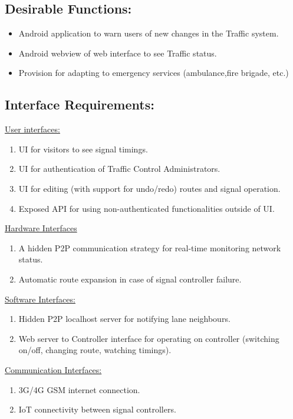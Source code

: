 \documentclass[12pt,a4paper,final]{report}
\begin{document}
\subsection{Desirable Functions:}
\begin{itemize}
	\item Android application to warn users of new changes in the Traffic system.
	\item Android webview of web interface to see Traffic status.
	\item Provision for adapting to emergency services (ambulance,fire brigade, etc.)
\end{itemize}

\subsection{Interface Requirements:}
\underline{User interfaces:}
\begin{enumerate}
	\item UI for visitors to see signal timings.
	\item UI for authentication of Traffic Control Administrators.
	\item UI for editing (with support for undo/redo) routes and signal operation.
	\item Exposed API for using non-authenticated functionalities outside of UI.
\end{enumerate}

\underline{Hardware Interfaces}
\begin{enumerate}
	\item A hidden P2P communication strategy for real-time monitoring network status.
	\item Automatic route expansion in case of signal controller failure.
\end{enumerate}
\underline{Software Interfaces:}
\begin{enumerate}
	\item Hidden P2P localhost server for notifying lane neighbours.
	\item Web server to Controller interface for operating on controller (switching on/off, changing route, watching timings).
\end{enumerate}

\underline{Communication Interfaces:}
\begin{enumerate}
	\item 3G/4G GSM internet connection.
	\item IoT connectivity between signal controllers.
\end{enumerate}
\end{document}
